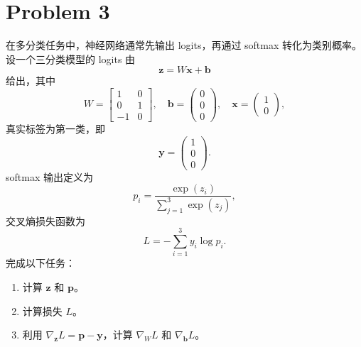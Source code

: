 \section*{Problem 3}

在多分类任务中，神经网络通常先输出 logits，再通过 softmax 转化为类别概率。设一个三分类模型的 logits 由
\[
\bm{z} = W \bm{x} + \bm{b}
\]
给出，其中
\[
W = \begin{bmatrix}
    1 & 0 \\
    0 & 1 \\
    -1 & 0
\end{bmatrix},\quad
\bm{b} = \begin{pmatrix} 0 \\ 0 \\ 0 \end{pmatrix},\quad
\bm{x} = \begin{pmatrix} 1 \\ 0 \end{pmatrix},
\]
真实标签为第一类，即
\[
\bm{y} = \begin{pmatrix} 1 \\ 0 \\ 0 \end{pmatrix}.
\]
softmax 输出定义为
\[
p_i = \frac{\exp(z_i)}{\sum_{j=1}^{3} \exp(z_j)},
\]
交叉熵损失函数为
\[
L = -\sum_{i=1}^{3} y_i \log p_i.
\]
完成以下任务：
\begin{enumerate}
    \item 计算 $\bm{z}$ 和 $\bm{p}$。
    \item 计算损失 $L$。
    \item 利用 $\nabla_{\bm{z}} L = \bm{p} - \bm{y}$，计算 $\nabla_W L$ 和 $\nabla_{\bm{b}} L$。
\end{enumerate}
